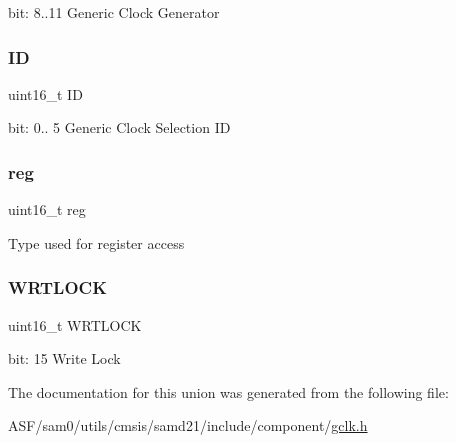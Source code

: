 bit\+: 8..11 Generic Clock Generator \mbox{\label{union_g_c_l_k___c_l_k_c_t_r_l___type_a9bb81603329def43dbb55e1ae69996d9}} 
\subsubsection{\texorpdfstring{ID}{ID}}
{\footnotesize\ttfamily uint16\+\_\+t ID}

bit\+: 0.. 5 Generic Clock Selection ID \mbox{\label{union_g_c_l_k___c_l_k_c_t_r_l___type_a11760f5020019f4aa8cb02e694f7cc44}} 
\subsubsection{\texorpdfstring{reg}{reg}}
{\footnotesize\ttfamily uint16\+\_\+t reg}

Type used for register access \mbox{\label{union_g_c_l_k___c_l_k_c_t_r_l___type_a356c7cc083fb5e02d9093189453a3e23}} 
\subsubsection{\texorpdfstring{WRTLOCK}{WRTLOCK}}
{\footnotesize\ttfamily uint16\+\_\+t W\+R\+T\+L\+O\+CK}

bit\+: 15 Write Lock 

The documentation for this union was generated from the following file\+:\begin{DoxyCompactItemize}
\item 
A\+S\+F/sam0/utils/cmsis/samd21/include/component/\mbox{\hyperlink{utils_2cmsis_2samd21_2include_2component_2gclk_8h}{gclk.\+h}}\end{DoxyCompactItemize}

